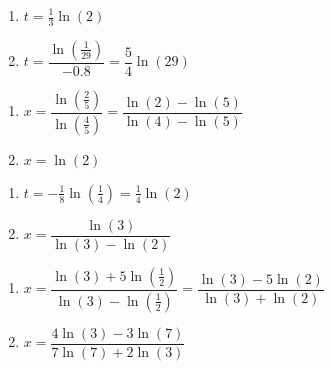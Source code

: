 \documentclass{ximera}
\begin{document}
\begin{multicols}{2}
\begin{enumerate}
\setcounter{enumi}{\value{HW}}

\item $t=\frac{1}{3}\ln(2)$ 

\item $t = \dfrac{\ln\left(\frac{1}{29}\right)}{-0.8} = \dfrac{5}{4}\ln(29)$

\setcounter{HW}{\value{enumi}}
\end{enumerate}
\end{multicols}

\begin{multicols}{2}
\begin{enumerate}
\setcounter{enumi}{\value{HW}}

\item $x = \dfrac{\ln\left(\frac{2}{5}\right)}{\ln\left(\frac{4}{5}\right)} = \dfrac{\ln(2)-\ln(5)}{\ln(4) - \ln(5)}$

\item $x =  \ln(2)$ 


\setcounter{HW}{\value{enumi}}
\end{enumerate}
\end{multicols}

\begin{multicols}{2}
\begin{enumerate}
\setcounter{enumi}{\value{HW}}


\item  $t = -\frac{1}{8} \ln\left(\frac{1}{4} \right) = \frac{1}{4}\ln(2)$ 

\item $x = \dfrac{\ln(3)}{\ln(3) - \ln(2)}$

\setcounter{HW}{\value{enumi}}
\end{enumerate}
\end{multicols}

\begin{multicols}{2}
\begin{enumerate}
\setcounter{enumi}{\value{HW}}


\item $x = \dfrac{\ln(3) + 5\ln\left(\frac{1}{2}\right)}{\ln(3) - \ln\left(\frac{1}{2}\right)} = \dfrac{\ln(3)-5\ln(2)}{\ln(3)+\ln(2)}$
\item  $x = \dfrac{4 \ln(3) - 3 \ln(7)}{7 \ln(7) + 2 \ln(3)}$ 

\setcounter{HW}{\value{enumi}}
\end{enumerate}
\end{multicols}
\end{document}
